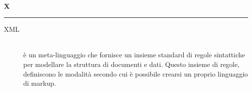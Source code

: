 \documentclass[12pt,a4paper]{article}
\begin{document}
\newpage

\begin{center}
\hfill\\
	\LARGE \textbf{X}
\hfill\\
\rule[15pt]{30pt}{0.5pt}
\end{center}

\begin{description}
\item[XML] 
\hfill\\è un meta-linguaggio che fornisce un insieme standard di regole sintattiche per modellare la struttura di documenti e dati. Questo insieme di regole, definiscono le modalità secondo cui è possibile crearsi un proprio linguaggio di markup.
\end{description}
\end{document}
